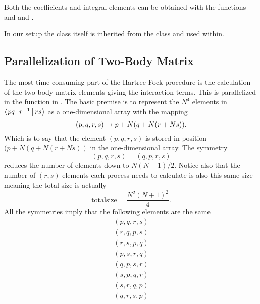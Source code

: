     Both the coefficients and integral elements can be obtained with the
    functions  and  and
    .

    In our setup the  class itself is inherited from the
     class and used within.

\subsection{Parallelization of Two-Body Matrix}
    The most time-consuming part of the Hartree-Fock procedure is the
    calculation of the two-body matrix-elements giving the interaction terms.
    This is parallelized in the  function in
    . The basic premise is to represent the $N^4$
    elements in $\Braket{pq|r^{-1}|rs}$ as a one-dimensional array with the
    mapping
        \begin{equation}
            (p,q,r,s) \rightarrow p + N(q + N(r + Ns)).
        \end{equation}
    Which is to say that the element $(p,q,r,s)$ is stored in position $(p +
    N(q + N(r + Ns))$ in the one-dimensional array. The symmetry 
        \begin{equation}
            (p,q,r,s)=(q,p,r,s)
        \end{equation}
    reduces the number of elements down to $N(N+1)/2$. Notice also that the
    number of $(r,s)$ elements each process needs to calculate is also this
    same size meaning the total size is actually
        \begin{equation}
            \text{totalsize} = \frac{N^2(N+1)^2}{4}.
        \end{equation}
    All the symmetries imply that the following elements are the same
        \begin{equation}
            \begin{aligned}
                (p,q,r,s) \\
                (r,q,p,s) \\
                (r,s,p,q) \\
                (p,s,r,q) \\
                (q,p,s,r) \\
                (s,p,q,r) \\
                (s,r,q,p) \\
                (q,r,s,p)
            \end{aligned}
        \end{equation}
